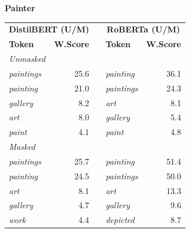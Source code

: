 \documentclass[11pt]{article}
\begin{document}
\vspace{4pt}\noindent\textbf{Painter}
\begin{center}\scriptsize
\begin{tabular}{lrllr}
\toprule
\multicolumn{2}{c}{\textbf{DistilBERT (U/M)}} & & \multicolumn{2}{c}{\textbf{RoBERTa (U/M)}} \\
\textbf{Token} & \textbf{W.Score} & & \textbf{Token} & \textbf{W.Score} \\
\midrule
\multicolumn{5}{l}{\textit{Unmasked}} \\
\emph{paintings} & 25.6 & & \emph{painting} & 36.1 \\
\emph{painting} & 21.0 & & \emph{paintings} & 24.3 \\
\emph{gallery} & 8.2 & & \emph{art} & 8.1 \\
\emph{art} & 8.0 & & \emph{gallery} & 5.4 \\
\emph{paint} & 4.1 & & \emph{paint} & 4.8 \\
\multicolumn{5}{l}{\textit{Masked}} \\
\emph{paintings} & 25.7 & & \emph{painting} & 51.4 \\
\emph{painting} & 24.5 & & \emph{paintings} & 50.0 \\
\emph{art} & 8.1 & & \emph{art} & 13.3 \\
\emph{gallery} & 4.7 & & \emph{gallery} & 9.6 \\
\emph{work} & 4.4 & & \emph{depicted} & 8.7 \\
\bottomrule
\end{tabular}
\end{center}
\end{document}
